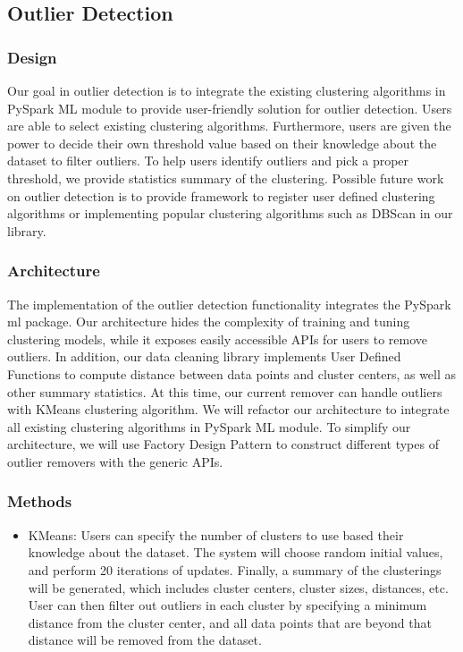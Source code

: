 \documentclass[sigconf]{acmart}
\begin{document}
\subsection{Outlier Detection}
\subsubsection{Design} 
Our goal in outlier detection is to integrate the existing clustering algorithms in PySpark ML module to provide user-friendly solution for outlier detection. Users are able to select existing clustering algorithms. Furthermore, users are given the power to decide their own threshold value based on their knowledge about the dataset to filter outliers. To help users identify outliers and pick a proper threshold, we provide statistics summary of the clustering. Possible future work on outlier detection is to provide framework to register user defined clustering algorithms or implementing popular clustering algorithms such as DBScan\cite{DBScan} in our library.

\subsubsection{Architecture}
The implementation of the outlier detection functionality integrates the PySpark ml package. Our architecture hides the complexity of training and tuning clustering models, while it exposes easily accessible APIs for users to remove outliers. In addition, our data cleaning library implements User Defined Functions to compute distance between data points and cluster centers, as well as other summary statistics. At this time, our current remover can handle outliers with KMeans clustering algorithm. We will refactor our architecture to integrate all existing clustering algorithms in PySpark ML module. To simplify our architecture, we will use Factory Design Pattern to construct different types of outlier removers with the generic APIs.

\subsubsection{Methods}
\begin{itemize}
	\item{KMeans}\cite{KMeans}: Users can specify the number of clusters to use based their knowledge about the dataset. The system will choose random initial values, and perform 20 iterations of updates. Finally, a summary of the clusterings will be generated, which includes cluster centers, cluster sizes, distances, etc. User can then filter out outliers in each cluster by specifying a minimum distance from the cluster center, and all data points that are beyond that distance will be removed from the dataset.
\end{itemize}
\end{document}
